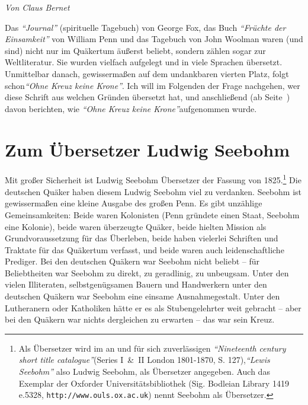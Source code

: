 
\begin{flushright}
\begin{footnotesize}
\textit{Von Claus Bernet}
\end{footnotesize}
\end{flushright}
\smallskip

Das \textit{"`Journal"'} (spirituelle Tagebuch) von George Fox, das Buch \textit{"`Früchte der Einsamkeit"'} von William
Penn und das Tagebuch von John
Woolman waren (und sind) nicht nur im Quäkertum
äußerst beliebt, sondern zählen sogar zur Weltliteratur.
Sie wurden vielfach aufgelegt und in viele Sprachen übersetzt. Unmittelbar
danach, gewissermaßen auf dem undankbaren vierten Platz, folgt schon\textit{"`Ohne
Kreuz keine Krone"'}. Ich will im Folgenden der Frage nachgehen, wer diese
Schrift
aus welchen Gründen übersetzt hat, und anschließend (ab
Seite~\pageref{ref:rezeptionsgeschichte}) davon berichten, wie \textit{"`Ohne Kreuz
keine Krone"'}aufgenommen wurde.

\section{Zum Übersetzer Ludwig Seebohm} \label{ref:l_seebohm}


Mit großer Sicherheit ist Ludwig Seebohm
Übersetzer der Fassung von 1825.\footnote{Als Übersetzer wird im an und für sich
zuverlässigen \textit{"`Nineteenth century
short title catalogue"'}(Series I~\&~II London 1801-1870, S. 127),\textit{"`Lewis
Seebohm"'} also Ludwig Seebohm, als Übersetzer angegeben. Auch das Exemplar der
Oxforder Universitätsbibliothek (Sig. Bodleian Library 1419 e.5328,
\texttt{http://www.ouls.ox.ac.uk}) nennt Seebohm als Übersetzer.}
Die deutschen Quäker haben diesem Ludwig Seebohm viel zu
verdanken. Seebohm ist gewissermaßen eine kleine Ausgabe des großen Penn. Es
gibt unzählige Gemeinsamkeiten: Beide waren Kolonisten (Penn gründete einen
Staat, Seebohm eine Kolonie), beide waren überzeugte Quäker, beide hielten
Mission als Grundvoraussetzung für das Überleben, beide haben
vielerlei Schriften und Traktate für das Quäkertum verfasst, und beide waren
auch leidenschaftliche Prediger.
Bei den deutschen Quäkern war Seebohm nicht beliebt -- für Beliebtheiten war
Seebohm zu direkt, zu geradlinig, zu unbeugsam. Unter den vielen Illiteraten,
selbstgenügsamen Bauern und
Handwerkern unter den deutschen Quäkern war Seebohm
eine einsame Ausnahmegestalt. Unter den Lutheranern
oder Katholiken hätte er es als Stubengelehrter weit
gebracht -- aber bei den Quäkern war nichts dergleichen zu erwarten -- das war
sein Kreuz.

